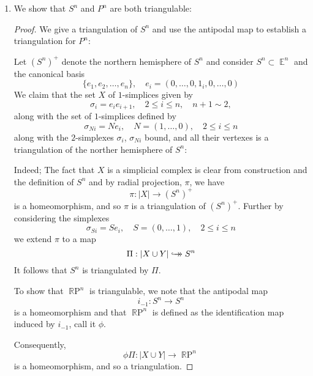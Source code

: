 \documentclass{book}
\DeclareMathOperator*{\R}{\mathbb{R}}
\DeclareMathOperator*{\E}{\mathbb{E}}
\DeclareMathOperator*{\RP}{\R\text{P}}
\newcommand{\bij}{\mathrel{\hookrightarrow\hspace{-1.8ex}\to}} %
\begin{document}
\begin{enumerate}[(1)]
    \item We show that $S^n$ and $P^n$ are both triangulable: 
        \begin{proof} We give a triangulation of $S^n$ and use the antipodal map to establish a triangulation for $P^n$: 
            \par Let $(S^n)^+$ denote the northern hemisphere of $S^n$ and consider $S^n \subset \E^n$ and the canonical basis
            \[\{e_1, e_2, \dots, e_n\}, \quad e_i = (0, \dots, 0, 1_i, 0, \dots , 0)\]
            We claim that the set $X$ of $1$-simplices given by 
            \[\sigma_i = e_ie_{i+1}, \quad 2 \leq i \leq n, \quad n+1 \sim 2,\]
            along with the set of $1$-simplices defined by 
            \[\sigma_{Ni} = Ne_i, \quad N = (1, \dots, 0), \quad 2 \leq i \leq n \]
            along with the $2$-simplexes $\sigma_i$, $\sigma_{Ni}$ bound, and all their vertexes is a triangulation of the norther hemisphere of $S^n$: 
            \par Indeed; The fact that $X$ is a simplicial complex is clear from construction and the definition of $S^n$ and by radial projection, $\pi$, we have 
            \[\pi: |X| \rightarrow (S^n)^+ \]
            is a homeomorphism, and so $\pi$ is a triangulation of $(S^n)^+$. Further by considering the simplexes 
            \[\sigma_{Si} = Se_i, \quad S = (0, \dots, 1), \quad 2 \leq i \leq n \]
            we extend $\pi$ to a map 
            \[\Pi: |X \cup Y| \bij S^n\] 
            It follows that $S^n$ is triangulated by $\Pi$. 
            \par To show that $\RP^n$ is triangulable, we note that the antipodal map 
            \[i_{-1}: S^n \rightarrow S^n\]
            is a homeomorphism and that $\RP^n$ is defined as the identification map induced by $i_{-1}$, call it $\phi$. 
            \par Consequently, 
            \[  \phi\Pi : |X \cup Y| \rightarrow \RP^n \]
            is a homeomorphism, and so a triangulation. 
        \end{proof}


\end{enumerate}
\end{document}
